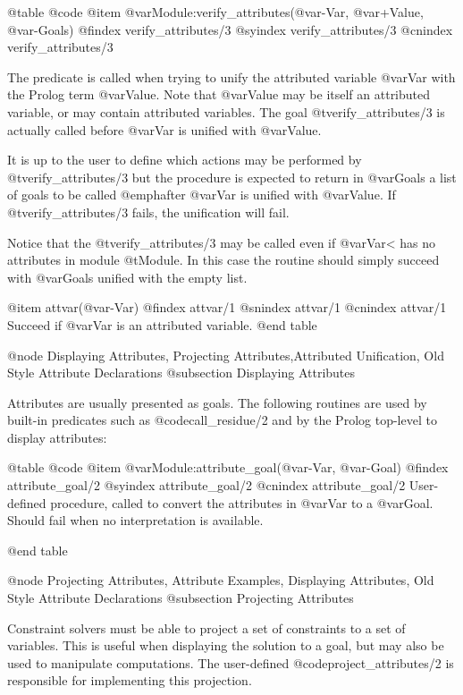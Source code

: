 @table @code
@item @var{Module}:verify_attributes(@var{-Var}, @var{+Value}, @var{-Goals})
@findex verify_attributes/3
@syindex verify_attributes/3
@cnindex verify_attributes/3

The predicate is called when trying to unify the attributed variable
@var{Var} with the Prolog term @var{Value}. Note that @var{Value} may be
itself an attributed variable, or may contain attributed variables.  The
goal @t{verify_attributes/3} is actually called before @var{Var} is
unified with @var{Value}.

It is up to the user to define which actions may be performed by
@t{verify_attributes/3} but the procedure is expected to return in
@var{Goals} a list of goals to be called @emph{after} @var{Var} is
unified with @var{Value}. If @t{verify_attributes/3} fails, the
unification will fail.

Notice that the @t{verify_attributes/3} may be called even if @var{Var}<
has no attributes in module @t{Module}. In this case the routine should
simply succeed with @var{Goals} unified with the empty list.

@item attvar(@var{-Var})
@findex attvar/1
@snindex attvar/1
@cnindex attvar/1
Succeed if @var{Var} is an attributed variable.
@end table



@node Displaying Attributes, Projecting Attributes,Attributed Unification, Old Style Attribute Declarations 
@subsection Displaying Attributes

Attributes are usually presented as goals. The following routines are
used by built-in predicates such as @code{call_residue/2} and by the
Prolog top-level to display attributes:

@table @code
@item @var{Module}:attribute_goal(@var{-Var}, @var{-Goal})
@findex attribute_goal/2
@syindex attribute_goal/2
@cnindex attribute_goal/2
User-defined procedure, called to convert the attributes in @var{Var} to
a @var{Goal}. Should fail when no interpretation is available.

@end table

@node Projecting Attributes, Attribute Examples, Displaying Attributes, Old Style Attribute Declarations
@subsection Projecting Attributes

Constraint solvers must be able to project a set of constraints to a set
of variables. This is useful when displaying the solution to a goal, but
may also be used to manipulate computations. The user-defined
@code{project_attributes/2} is responsible for implementing this
projection.


